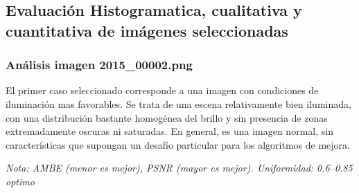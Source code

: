 \documentclass[sigchi]{acmart}
\begin{document}
\subsection{Evaluación Histogramatica, cualitativa y cuantitativa de imágenes seleccionadas}

\subsubsection{Análisis imagen 2015\_00002.png}

El primer caso seleccionado corresponde a una imagen con condiciones de iluminación mas
favorables. Se trata de una escena relativamente bien iluminada, con una distribución bastante
homogénea del brillo y sin presencia de zonas extremadamente oscuras ni saturadas. En general,
es una imagen normal, sin características que supongan un desafío particular para los
algoritmos de mejora.

\begin{table}[H]
	\centering
	\caption{Métricas de calidad para la imagen 2015\_00002.png}
	\label{tab:metricas_2015_00002}

	\vspace{0.5em} %


	\vspace{0.5em} %
	\footnotesize%
	\textit{Nota: AMBE (menor es mejor), PSNR (mayor es mejor). Uniformidad: 0.6–0.85 optimo}
\end{table}
\end{document}
